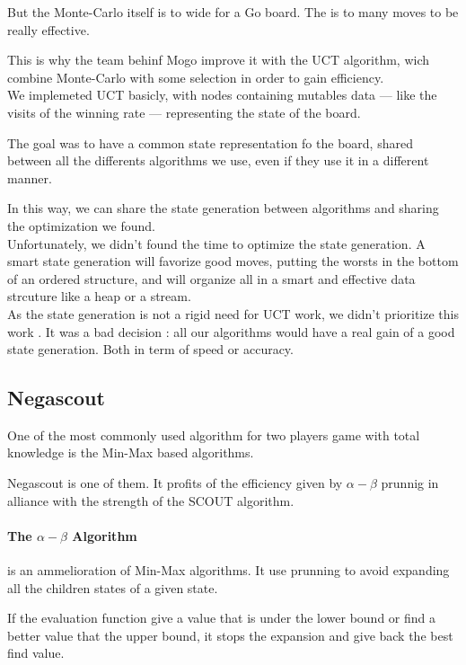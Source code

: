 But the Monte-Carlo itself is to wide for a Go board. The is to many moves to be really effective.

This is why the team behinf Mogo improve it with the UCT algorithm, wich combine Monte-Carlo with some selection in order to gain efficiency.\\

We implemeted UCT basicly, with nodes containing mutables data --- like the visits of the winning rate --- representing the state of the board.

The goal was to have a common state representation fo the board, shared between all the differents algorithms we use, even if they use it in a different manner.

In this way, we can share the state generation between algorithms and sharing the optimization we found.\\

Unfortunately, we didn't found the time to optimize the state generation. A smart state generation will favorize good moves, putting the worsts in the bottom of an ordered structure, and will organize all in a smart and effective data strcuture like a heap or a stream.\\

As the state generation is not a rigid need for UCT work, we didn't prioritize this work . It was a bad decision : all our algorithms would have a real gain of a good state generation. Both in term of speed or accuracy.


\subsection{Negascout}

One of the most commonly used algorithm for two players game with total knowledge is the Min-Max based algorithms.

Negascout is one of them. It profits of the efficiency given by $\alpha-\beta$ prunnig in alliance with the strength of the SCOUT algorithm.

\paragraph{The $\alpha-\beta$ Algorithm}
is an ammelioration of Min-Max algorithms. It use prunning to avoid expanding all the children states of a given state.

If the evaluation function give a value that is under the lower bound or find a better value that the upper bound, it stops the expansion and give back the best find value.

